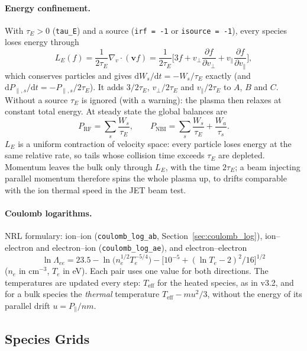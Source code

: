 \documentclass[11pt,a4paper]{article}
\newcommand{\vp}{v_\perp}
\newcommand{\vpa}{v_\parallel}
\begin{document}
\paragraph{Energy confinement.}
With $\tau_E>0$ (\texttt{tau\_E}) and a source (\texttt{irf = -1} or \texttt{isource = -1}), every
species loses energy through
\begin{equation}
L_E(f)=\frac{1}{2\tau_E}\nabla_v\cdot(\bm v f)=\frac{1}{2\tau_E}\Big[3f+\vp\frac{\partial f}{\partial\vp}
+\vpa\frac{\partial f}{\partial\vpa}\Big],
\end{equation}
which conserves particles and gives $\mathrm dW_s/\mathrm dt=-W_s/\tau_E$ exactly (and
$\mathrm dP_{\parallel,s}/\mathrm dt=-P_{\parallel,s}/2\tau_E$).  It adds $3/2\tau_E$, $\vp/2\tau_E$ and
$\vpa/2\tau_E$ to $A$, $B$ and $C$.  Without a source $\tau_E$ is ignored (with a warning): the
plasma then relaxes at constant total energy.  At steady state the global balances are
\begin{equation}
P_\mathrm{RF}=\sum_s\frac{W_s}{\tau_E},\qquad
P_\mathrm{NBI}=\sum_s\frac{W_s}{\tau_E}+\frac{W_a}{\tau_s}.
\end{equation}
$L_E$ is a uniform contraction of velocity space: every particle loses energy at the same relative
rate, so tails whose collision time exceeds $\tau_E$ are depleted.  Momentum leaves the bulk only
through $L_E$, with the time $2\tau_E$; a beam injecting parallel momentum therefore spins the whole
plasma up, to drifts comparable with the ion thermal speed in the JET beam test.

\paragraph{Coulomb logarithms.}
NRL formulary: ion--ion (\texttt{coulomb\_log\_ab}, Section~\ref{sec:coulomb_log}), ion--electron and
electron--ion (\texttt{coulomb\_log\_ae}), and electron--electron
\begin{equation}
\ln\Lambda_{ee}=23.5-\ln\!\big(n_e^{1/2}T_e^{-5/4}\big)-\big[10^{-5}+(\ln T_e-2)^2/16\big]^{1/2}
\end{equation}
($n_e$ in cm$^{-3}$, $T_e$ in eV).  Each pair uses one value for both directions.  The temperatures
are updated every step: $T_\mathrm{eff}$ for the heated species, as in v3.2, and for a bulk species
the \emph{thermal} temperature $T_\mathrm{eff}-m u^2/3$, without the energy of its parallel drift
$u=P_\parallel/nm$.

\subsection{Species Grids}
\label{sec:ms_grids}
\end{document}
